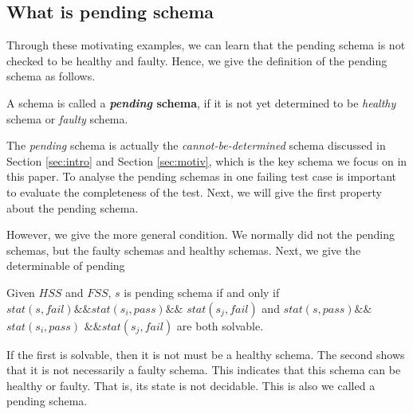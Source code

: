 \subsection{What is pending schema}

Through these motivating examples, we can learn that the pending schema is not checked to be healthy and faulty. Hence, we give the definition of the pending schema as follows. 

%
%
%
%

\begin{definition}\label{de:pending}
A schema is called a \textbf{\emph{pending} schema}, if it is not yet determined to be \emph{healthy} schema or \emph{faulty} schema.
\end{definition}

The \emph{pending} schema is actually the \emph{cannot-be-determined} schema discussed in Section \ref{sec:intro} and Section \ref{sec:motiv}, which is the key schema we focus on in this paper. To analyse the pending schemas in one failing test case is important to evaluate the completeness of the test.  Next, we will give the first property about the pending schema.


However, we give the more general condition. We normally did not the pending schemas, but the faulty schemas and healthy schemas.
Next, we give the determinable of pending


\begin{proposition}\label{pro:determinableparthealthy}
Given $HSS$ and $FSS$, $s$ is pending schema if and  only if $stat(s, fail) \&\& stat(s_{i}, pass) \&\&$ $stat(s_{j}, fail)$ and $stat(s, pass) \&\&$ $stat(s_{i}, pass)$ $\&\& stat(s_{j}, fail)$ are both solvable.
\end{proposition}

If the first is solvable, then it is not must be a healthy schema. The second shows that it is not necessarily a faulty schema. This indicates that this schema can be healthy or faulty. That is, its state is not decidable. This is also we called a pending schema.

